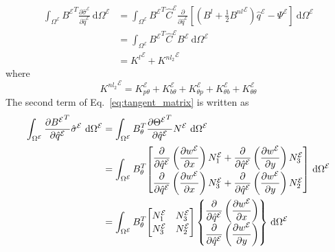 \documentclass[12pt]{article}
\numberwithin{equation}{section}
\newcommand{\pdiff}[2]{ \frac{\partial #1}{ \partial #2} }
\newcommand{\dpdiff}[2]{ \dfrac{\partial #1}{ \partial #2} }
\def\el{{ \mathcal{E} }}
\begin{document}
% 
\begin{equation}
    \begin{aligned}
        \int_{\Omega^\el} {B^\el}^T \pdiff{\hat{\sigma}^\el}{\hat{q}^\el} ~ \text{d}\Omega^\el
         & =
        \int_{\Omega^\el} {B^\el}^T \hat{C}^\el \pdiff{}{\hat{q}^\el}
        \left[
            \left( B^l + \frac{1}{2}{B^{nl}}^\el \right) \hat{q}^\el -
            \Psi^\el
        \right] ~ \text{d} \Omega^\el                                      \\
         & =
        \int_{\Omega^\el} {B^\el}^T \hat{C}^\el B^\el ~ \text{d}\Omega^\el \\
         & =
        {K^l}^\el + {K^{nl_2}}^\el
    \end{aligned}
    \label{eq:first_term_tangent_matrix}
\end{equation}
% 
where 
% 
\begin{equation}
    {K^{nl_2}}^\el = 
    K_{p \theta}^\el +
    K_{b \theta}^\el +
    K_{\theta p}^\el +
    K_{\theta b}^\el +
    K_{\theta \theta}^\el
\end{equation}
%
The second term of Eq.~\eqref{eq:tangent_matrix} is written as
%
\begin{equation}
    \begin{aligned}
        \int_{\Omega^\el} \pdiff{{B^\el}^T}{\hat{q}^\el} \hat{\sigma}^\el ~ \text{d}\Omega^\el
         & =
        \int_{\Omega^\el} B_\theta^T \pdiff{{\Theta^\el}^T}{\hat{q}^\el} N^\el ~ \text{d}\Omega^\el \\
         & =
        \int_{\Omega^\el} B_\theta^T
        {\renewcommand\arraystretch{2.0}
        \begin{bmatrix}
            \dpdiff{}{\hat{q}^\el} \left( \dpdiff{w^\el}{x} \right) N^\el_1 +
            \dpdiff{}{\hat{q}^\el} \left( \dpdiff{w^\el}{y} \right) N^\el_3 \\
            \dpdiff{}{\hat{q}^\el} \left( \dpdiff{w^\el}{x} \right) N^\el_3 +
            \dpdiff{}{\hat{q}^\el} \left( \dpdiff{w^\el}{y} \right) N^\el_2 
        \end{bmatrix}} ~ \text{d}\Omega^\el            \\
         & =
        \int_{\Omega^\el} B_\theta^T
        {\renewcommand\arraystretch{1.15}
        \begin{bmatrix}
            N^\el_1 & N^\el_3 \\
            N^\el_3 & N^\el_2
        \end{bmatrix}
        \begin{Bmatrix}
            \dpdiff{}{\hat{q}^\el} \left( \dpdiff{w^\el}{x} \right) \\
            \dpdiff{}{\hat{q}^\el} \left( \dpdiff{w^\el}{y} \right)
        \end{Bmatrix}}
        ~ \text{d}\Omega^\el
    \end{aligned}
    \label{eq:second_term_tangent_matrix}
\end{equation}
\end{document}
